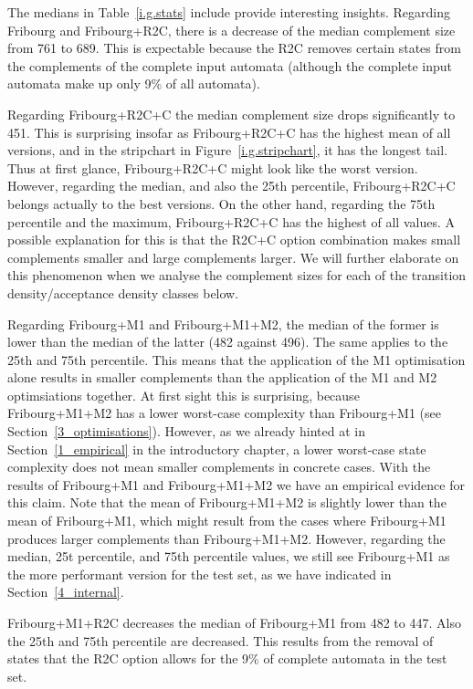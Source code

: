 The medians in Table~\ref{i.g.stats} include provide interesting insights. Regarding Fribourg and Fribourg+R2C, there is a decrease of the median complement size from 761 to 689. This is expectable because the R2C removes certain states from the complements of the complete input automata (although the complete input automata make up only 9\% of all automata).

Regarding Fribourg+R2C+C the median complement size drops significantly to 451. This is surprising insofar as Fribourg+R2C+C has the highest mean of all versions, and in the stripchart in Figure~\ref{i.g.stripchart}, it has the longest tail. Thus at first glance, Fribourg+R2C+C might look like the worst version. However, regarding the median, and also the 25th percentile, Fribourg+R2C+C belongs actually to the best versions. On the other hand, regarding the 75th percentile and the maximum, Fribourg+R2C+C has the highest of all values. A possible explanation for this is that the R2C+C option combination makes small complements smaller and large complements larger. We will further elaborate on this phenomenon when we analyse the complement sizes for each of the transition density/acceptance density classes below. 

Regarding Fribourg+M1 and Fribourg+M1+M2, the median of the former is lower than the median of the latter (482 against 496). The same applies to the 25th and 75th percentile. This means that the application of the M1 optimisation alone results in smaller complements than the application of the M1 and M2 optimsiations together. At first sight this is surprising, because Fribourg+M1+M2 has a lower worst-case complexity than Fribourg+M1 (see Section~\ref{3_optimisations}). However, as we already hinted at in Section~\ref{1_empirical} in the introductory chapter, a lower worst-case state complexity does not mean smaller complements in concrete cases. With the results of Fribourg+M1 and Fribourg+M1+M2 we have an empirical evidence for this claim. Note that the mean of Fribourg+M1+M2 is slightly lower than the mean of Fribourg+M1, which might result from the cases where Fribourg+M1 produces larger complements than Fribourg+M1+M2. However, regarding the median, 25t percentile, and 75th percentile values, we still see Fribourg+M1 as the more performant version for the \goal{} test set, as we have indicated in Section~\ref{4_internal}.

Fribourg+M1+R2C decreases the median of Fribourg+M1 from 482 to 447. Also the 25th and 75th percentile are decreased. This results from the removal of states that the R2C option allows for the 9\% of complete automata in the \goal{} test set.

